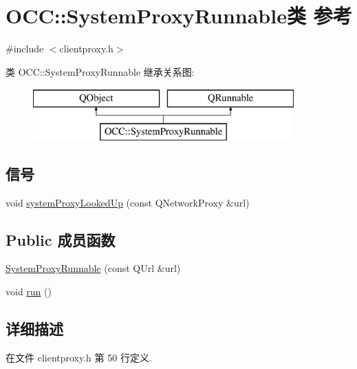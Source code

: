 \hypertarget{class_o_c_c_1_1_system_proxy_runnable}{}\section{O\+CC\+:\+:System\+Proxy\+Runnable类 参考}
\label{class_o_c_c_1_1_system_proxy_runnable}


{\ttfamily \#include $<$clientproxy.\+h$>$}

类 O\+CC\+:\+:System\+Proxy\+Runnable 继承关系图\+:\begin{figure}[H]
\begin{center}
\leavevmode
\includegraphics[height=2.000000cm]{class_o_c_c_1_1_system_proxy_runnable}
\end{center}
\end{figure}
\subsection*{信号}
\begin{DoxyCompactItemize}
\item 
void \hyperlink{class_o_c_c_1_1_system_proxy_runnable_af30eef66b0a55040ef6baa43da383b09}{system\+Proxy\+Looked\+Up} (const Q\+Network\+Proxy \&url)
\end{DoxyCompactItemize}
\subsection*{Public 成员函数}
\begin{DoxyCompactItemize}
\item 
\hyperlink{class_o_c_c_1_1_system_proxy_runnable_a00d8e1c317e506d2c1e70c3afe01ebce}{System\+Proxy\+Runnable} (const Q\+Url \&url)
\item 
void \hyperlink{class_o_c_c_1_1_system_proxy_runnable_a6fdc170b7ef6da6823a34fd84c793b15}{run} ()
\end{DoxyCompactItemize}


\subsection{详细描述}


在文件 clientproxy.\+h 第 50 行定义.



